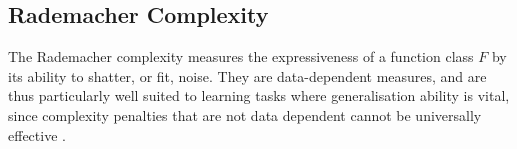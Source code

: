 \documentclass[twoside]{article}
\begin{document}
		\subsection{Rademacher Complexity}
		
			The Rademacher complexity \citep{bartlett2002rademacher} measures the expressiveness of a function class $F$ by its ability to shatter, or fit, noise. They are data-dependent measures, and are thus particularly well suited to learning tasks where generalisation ability is vital, since complexity penalties that are not data dependent cannot be universally effective \citep{kearns1997experimental}. 
	

	
	
	
\end{document}

